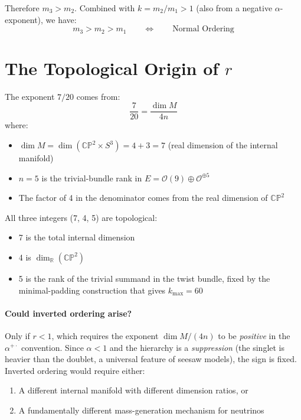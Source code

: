 \documentclass[11pt,a4paper]{article}
\begin{document}
Therefore $m_3 > m_2$. Combined with $k = m_2/m_1 > 1$ (also from a
negative $\alpha$-exponent), we have:
\begin{equation}
m_3 > m_2 > m_1 \qquad \Longleftrightarrow \qquad \text{Normal Ordering}
\end{equation}

\section{The Topological Origin of $r$}

The exponent $7/20$ comes from:
\begin{equation}
\frac{7}{20} = \frac{\dim M}{4n}
\end{equation}
where:
\begin{itemize}
\item $\dim M = \dim(\mathbb{CP}^2 \times S^3) = 4 + 3 = 7$ (real
  dimension of the internal manifold)
\item $n = 5$ is the trivial-bundle rank in $E = \mathcal{O}(9) \oplus
  \mathcal{O}^{\oplus 5}$
\item The factor of 4 in the denominator comes from the real dimension
  of $\mathbb{CP}^2$
\end{itemize}

All three integers (7, 4, 5) are topological:
\begin{itemize}
\item 7 is the total internal dimension
\item 4 is $\dim_{\mathbb{R}}(\mathbb{CP}^2)$
\item 5 is the rank of the trivial summand in the twist bundle, fixed by
  the minimal-padding construction that gives $k_{\max} = 60$
\end{itemize}

\paragraph{Could inverted ordering arise?}
Only if $r < 1$, which requires the exponent $\dim M/(4n)$ to be
\emph{positive} in the $\alpha^{+\cdot}$ convention. Since $\alpha < 1$
and the hierarchy is a \emph{suppression} (the singlet is heavier than
the doublet, a universal feature of seesaw models), the sign is fixed.
Inverted ordering would require either:
\begin{enumerate}
\item A different internal manifold with different dimension ratios, or
\item A fundamentally different mass-generation mechanism for neutrinos
\end{enumerate}
\end{document}
